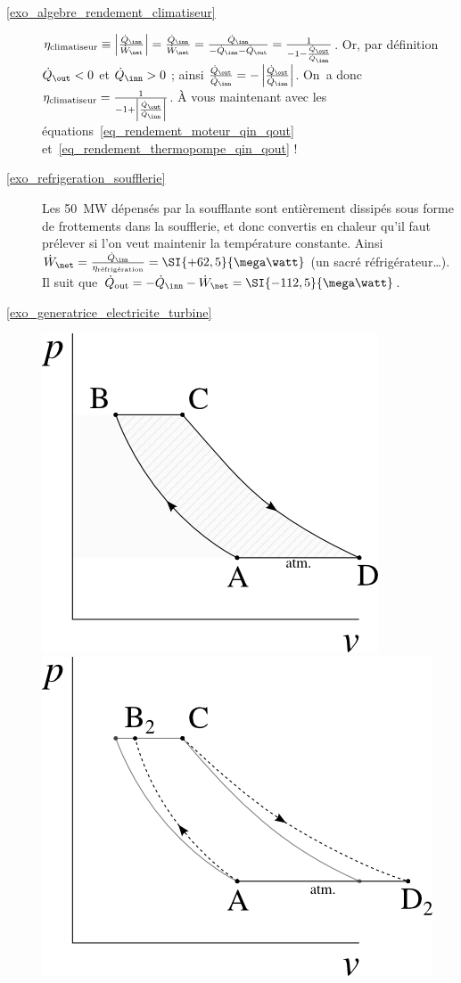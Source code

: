 \begin{description}
	\item [\ref{exo_algebre_rendement_climatiseur}]
			\tab $ \eta_\text{climatiseur}
			\equiv \left|\frac{\dot Q_\inn}{\dot W_\net}\right|
			= \frac{\dot Q_\inn}{\dot W_\net}
			= \frac{\dot Q_\inn}{-\dot Q_\inn - \dot Q_\out}
			= \frac{1}{-1 - \frac{\dot Q_\out}{\dot Q_\inn}}$.
			Or, par définition $\dot Q_\out < 0$ et $\dot Q_\inn > 0$ ; ainsi $\frac{\dot Q_\out}{\dot Q_\inn} = -\left|\frac{\dot Q_\out}{\dot Q_\inn}\right|$.
			On~a donc $\eta_\text{climatiseur} = \frac{1}{-1 + \left|\frac{\dot Q_\out}{\dot Q_\inn}\right|}$. À vous maintenant avec les équations~\ref{eq_rendement_moteur_qin_qout} et~\ref{eq_rendement_thermopompe_qin_qout} !			
	\item [\ref{exo_refrigeration_soufflerie}]
			\tab Les \SI{50}{\mega\watt} dépensés par la soufflante sont entièrement dissipés sous forme de frottements dans la soufflerie, et donc convertis en chaleur qu’il faut prélever si l’on veut maintenir la température constante. Ainsi $\dot W_\net = \frac{\dot Q_\inn}{\eta_\text{réfrigération}} = \SI{+62,5}{\mega\watt}$ (un sacré réfrigérateur…). Il suit que $\dot Q_\text{out} = -\dot Q_\inn - \dot W_\net = \SI{-112,5}{\mega\watt}$.
	\item [\ref{exo_generatrice_electricite_turbine}]
			\includegraphics[height=\solutiondiagramwidth]{images/exo_sol_pv_turbomoteur_1.png}
			\includegraphics[height=\solutiondiagramwidth]{images/exo_sol_pv_turbomoteur_2.png}

\end{description}
